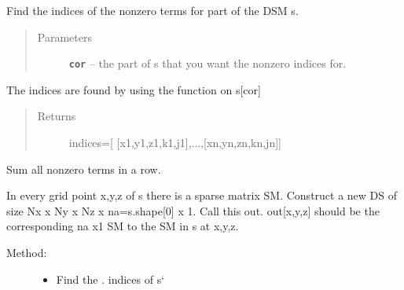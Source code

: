 \documentclass[letterpaper,10pt,english]{sphinxmanual}
\begin{document}
\begin{fulllineitems}
\begin{fulllineitems}
\begin{quote}
\begin{description}
\end{description}\end{quote}

\end{fulllineitems}


\begin{fulllineitems}
\label{index:DictionarySparseMatrix.DS.nonzeroMat}
Find the indices of the nonzero terms for part of the DSM s.
\begin{quote}\begin{description}
\item[{Parameters}] \leavevmode
\textbf{\texttt{cor}} -- the part of s that you want the nonzero indices for.

\end{description}\end{quote}

The indices are found by using the {\hyperref[index:DictionarySparseMatrix.DS.nonzero]{}} function on s{[}cor{]}
\begin{quote}\begin{description}
\item[{Returns}] \leavevmode
indices={[} {[}x1,y1,z1,k1,j1{]},...,{[}xn,yn,zn,kn,jn{]}{]}

\end{description}\end{quote}

\end{fulllineitems}


\begin{fulllineitems}
\label{index:DictionarySparseMatrix.DS.row_sum}
Sum all nonzero terms in a row.

In every grid point x,y,z of s there is a sparse matrix SM.
Construct a new DS of size Nx x Ny x Nz x na=s.shape{[}0{]} x 1.
Call this out.
out{[}x,y,z{]} should be the corresponding na x1 SM to the SM in s at x,y,z.
\begin{description}
\item[{Method:}] \leavevmode\begin{itemize}
\item {} 
Find the {\hyperref[index:DictionarySparseMatrix.DS]{}}. {\hyperref[index:DictionarySparseMatrix.DS.nonzero]{}} indices of s{}`


\end{itemize}
\end{description}
\end{fulllineitems}
\end{fulllineitems}
\end{document}
